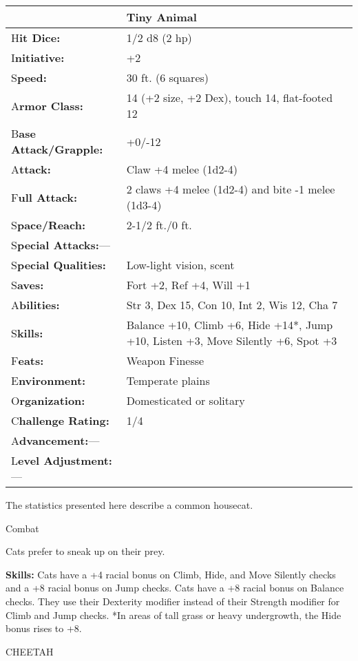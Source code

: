 \documentclass{article}
\begin{document}
\begin{tabular}{|>{\raggedright}p{91pt}|>{\raggedright}p{222pt}|}
\hline
  & Tiny Animal\tabularnewline
\hline
H\textbf{it Dice:} & 1/2 d8 (2 hp)\tabularnewline
\hline
I\textbf{nitiative:} & +2\tabularnewline
\hline
S\textbf{peed:} & 30 ft. (6 squares)\tabularnewline
\hline
A\textbf{rmor Class:} & 14 (+2 size, +2 Dex), touch 14, flat-footed 12\tabularnewline
\hline
B\textbf{ase Attack/Grapple:} & +0/-12\tabularnewline
\hline
A\textbf{ttack:} & Claw +4 melee (1d2-4)\tabularnewline
\hline
F\textbf{ull Attack:} & 2 claws +4 melee (1d2-4) and bite -1 melee (1d3-4)\tabularnewline
\hline
S\textbf{pace/Reach:} & 2-1/2 ft./0 ft.\tabularnewline
\hline
S\textbf{pecial Attacks:}--- & \tabularnewline
\hline
S\textbf{pecial Qualities:} & Low-light vision, scent\tabularnewline
\hline
S\textbf{aves:} & Fort +2, Ref +4, Will +1\tabularnewline
\hline
A\textbf{bilities:} & Str 3, Dex 15, Con 10, Int 2, Wis 12, Cha 7\tabularnewline
\hline
S\textbf{kills:} & Balance +10, Climb +6, Hide +14*, Jump +10, Listen +3, Move 
Silently +6, Spot +3\tabularnewline
\hline
F\textbf{eats:} & Weapon Finesse\tabularnewline
\hline
E\textbf{nvironment:} & Temperate plains\tabularnewline
\hline
O\textbf{rganization:} & Domesticated or solitary\tabularnewline
\hline
C\textbf{hallenge Rating:} & 1/4\tabularnewline
\hline
A\textbf{dvancement:}--- & \tabularnewline
\hline
L\textbf{evel Adjustment:}--- & \tabularnewline
\hline
\end{tabular}

The statistics presented here describe a common housecat.

Combat

Cats prefer to sneak up on their prey.

\textbf{Skills:} Cats have a +4 racial bonus on Climb, Hide, and Move Silently 
checks and a +8 racial bonus on Jump checks. Cats have a +8 racial bonus on Balance 
checks. They use their Dexterity modifier instead of their Strength modifier for 
Climb and Jump checks. *In areas of tall grass or heavy undergrowth, the Hide bonus 
rises to +8.

\vspace{12pt}
CHEETAH
\end{document}
